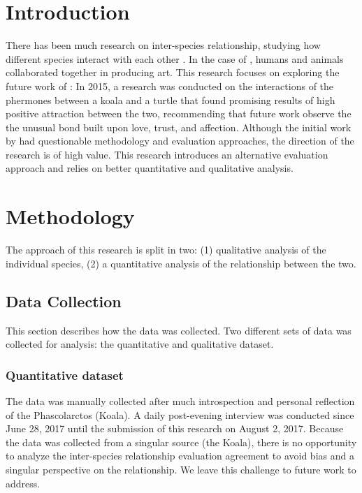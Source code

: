 \documentclass[conference]{IEEEtran}
\begin{document}
%
\IEEEpeerreviewmaketitle

\section{Introduction}
There has been much research on inter-species relationship, studying how different species interact with each other \cite{Sapalo,Jevbratt}. In the case of \cite{Jevbratt}, humans and animals collaborated together in producing art. This research focuses on exploring the future work of \cite{Sapalo}: In 2015, a research was conducted on the interactions of the phermones between a koala and a turtle that found promising results of high positive attraction between the two, recommending that future work observe the the unusual bond built upon love, trust, and affection. Although the initial work by \cite{Sapalo} had questionable methodology and evaluation approaches, the direction of the research is of high value. This research introduces an alternative evaluation approach and relies on better quantitative and qualitative analysis.

\section{Methodology}
\label{sec:methodology}
The approach of this research is split in two: (1) qualitative analysis of the individual species, (2) a quantitative analysis of the relationship between the two.

\subsection{Data Collection}

This section describes how the data was collected. Two different sets of data was collected for analysis: the quantitative and qualitative dataset.

\subsubsection{Quantitative dataset}
The data was manually collected after much introspection and personal reflection of the Phascolarctos (Koala). A daily post-evening interview was conducted since June 28, 2017 until the submission of this research on August 2, 2017. Because the data was collected from a singular source (the Koala), there is no opportunity to analyze the inter-species relationship evaluation agreement to avoid bias and a singular perspective on the relationship. We leave this challenge to future work to address.
\end{document}
